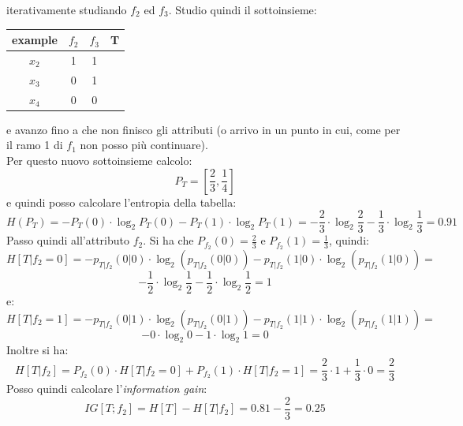 \begin{esempio}
  iterativamente studiando $f_2$ ed $f_3$. Studio quindi il sottoinsieme: 
  \begin{table}[H]
    \centering
    \begin{tabular}{c|c|c|c}
      example  & $f_2$ & $f_3$ & T\\
      \hline
      $x_2$ & 1 & 1 & \color{red}{0}\\
      $x_3$ & 0 & 1 & \color{darkgreen}{1}\\
      $x_4$ & 0 & 0 & \color{red}{0}\\
    \end{tabular}
  \end{table}
  e avanzo fino a che non finisco gli attributi (o arrivo in un punto in cui,
  come per il ramo 1 di $f_1$ non posso più continuare).\\
  Per questo nuovo sottoinsieme calcolo:
  \[P_T=\left[\frac{2}{3},\frac{1}{4}\right]\]
  e quindi posso calcolare l'entropia della tabella:
  \[H(P_T)=-P_T(0)\cdot \log_2 P_T(0)-P_T(1)\cdot\log_2
    P_T(1)=-\frac{2}{3}\cdot\log_2\frac{2}{3}-\frac{1}{3}\cdot\log_2
    \frac{1}{3}= 0.91\]
  Passo quindi all'attributo $f_2$. Si ha che $P_{f_2}(0)=\frac{2}{3}$ e
  $P_{f_2}(1)=\frac{1}{3}$, quindi:
  \[H[T|f_2=0]=-p_{T|f_2}(0|0)\cdot \log_2(p_{T|f_2}(0|0))-p_{T|f_2}(1|0)\cdot
    \log_2(p_{T|f_2}(1|0))=\]
  \[-\frac{1}{2}\cdot \log_2 \frac{1}{2}-\frac{1}{2}\cdot \log_2 \frac{1}{2}=1\]
  e:
  \[H[T|f_2=1]=-p_{T|f_2}(0|1)\cdot \log_2(p_{T|f_2}(0|1))-p_{T|f_2}(1|1)\cdot
    \log_2(p_{T|f_2}(1|1))=\]
  \[-0\cdot \log_2 0-1\cdot \log_2 1=0\]
  Inoltre si ha:
  \[H[T|f_2]=P_{f_2}(0)\cdot H[T|f_2=0]+P_{f_2}(1)\cdot
    H[T|f_2=1]=\frac{2}{3}\cdot 1+\frac{1}{3}\cdot 0=\frac{2}{3}\]
  Posso quindi calcolare l'\textit{information gain}:
  \[IG[T;f_2]=H[T]-H[T|f_2]=0.81-\frac{2}{3}=0.25\]
  

\end{esempio}
